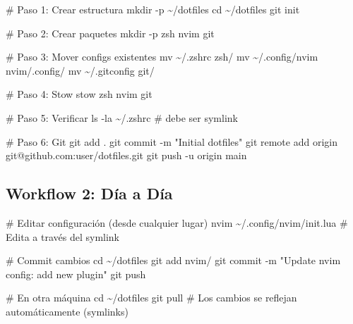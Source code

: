 \documentclass[
  doc,
  floatsintext,
  longtable,
  a4paper,
  nolmodern,
  notxfonts,
  notimes,
  12pt,
  colorlinks=true,linkcolor=blue,citecolor=blue,urlcolor=blue]{apa7}
\newenvironment{Shaded}{\begin{snugshade}}{\end{snugshade}}
\newcommand{\AttributeTok}[1]{\textcolor[rgb]{0.40,0.45,0.13}{#1}}
\newcommand{\BuiltInTok}[1]{\textcolor[rgb]{0.00,0.23,0.31}{#1}}
\newcommand{\CommentTok}[1]{\textcolor[rgb]{0.37,0.37,0.37}{#1}}
\newcommand{\ExtensionTok}[1]{\textcolor[rgb]{0.00,0.23,0.31}{#1}}
\newcommand{\FunctionTok}[1]{\textcolor[rgb]{0.28,0.35,0.67}{#1}}
\newcommand{\NormalTok}[1]{\textcolor[rgb]{0.00,0.23,0.31}{#1}}
\newcommand{\StringTok}[1]{\textcolor[rgb]{0.13,0.47,0.30}{#1}}
\begin{document}
\begin{Shaded}
\begin{Highlighting}[]
\CommentTok{\# Paso 1: Crear estructura}
\FunctionTok{mkdir} \AttributeTok{{-}p}\NormalTok{ \textasciitilde{}/dotfiles}
\BuiltInTok{cd}\NormalTok{ \textasciitilde{}/dotfiles}
\FunctionTok{git}\NormalTok{ init}

\CommentTok{\# Paso 2: Crear paquetes}
\FunctionTok{mkdir} \AttributeTok{{-}p}\NormalTok{ zsh nvim git}

\CommentTok{\# Paso 3: Mover configs existentes}
\FunctionTok{mv}\NormalTok{ \textasciitilde{}/.zshrc zsh/}
\FunctionTok{mv}\NormalTok{ \textasciitilde{}/.config/nvim nvim/.config/}
\FunctionTok{mv}\NormalTok{ \textasciitilde{}/.gitconfig git/}

\CommentTok{\# Paso 4: Stow}
\ExtensionTok{stow}\NormalTok{ zsh nvim git}

\CommentTok{\# Paso 5: Verificar}
\FunctionTok{ls} \AttributeTok{{-}la}\NormalTok{ \textasciitilde{}/.zshrc  }\CommentTok{\# debe ser symlink}

\CommentTok{\# Paso 6: Git}
\FunctionTok{git}\NormalTok{ add .}
\FunctionTok{git}\NormalTok{ commit }\AttributeTok{{-}m} \StringTok{"Initial dotfiles"}
\FunctionTok{git}\NormalTok{ remote add origin git@github.com:user/dotfiles.git}
\FunctionTok{git}\NormalTok{ push }\AttributeTok{{-}u}\NormalTok{ origin main}
\end{Highlighting}
\end{Shaded}

\subsection{Workflow 2: Día a Día}\label{workflow-2-duxeda-a-duxeda}

\begin{Shaded}
\begin{Highlighting}[]
\CommentTok{\# Editar configuración (desde cualquier lugar)}
\ExtensionTok{nvim}\NormalTok{ \textasciitilde{}/.config/nvim/init.lua  }\CommentTok{\# Edita a través del symlink}

\CommentTok{\# Commit cambios}
\BuiltInTok{cd}\NormalTok{ \textasciitilde{}/dotfiles}
\FunctionTok{git}\NormalTok{ add nvim/}
\FunctionTok{git}\NormalTok{ commit }\AttributeTok{{-}m} \StringTok{"Update nvim config: add new plugin"}
\FunctionTok{git}\NormalTok{ push}

\CommentTok{\# En otra máquina}
\BuiltInTok{cd}\NormalTok{ \textasciitilde{}/dotfiles}
\FunctionTok{git}\NormalTok{ pull}
\CommentTok{\# Los cambios se reflejan automáticamente (symlinks)}
\end{Highlighting}
\end{Shaded}
\end{document}
